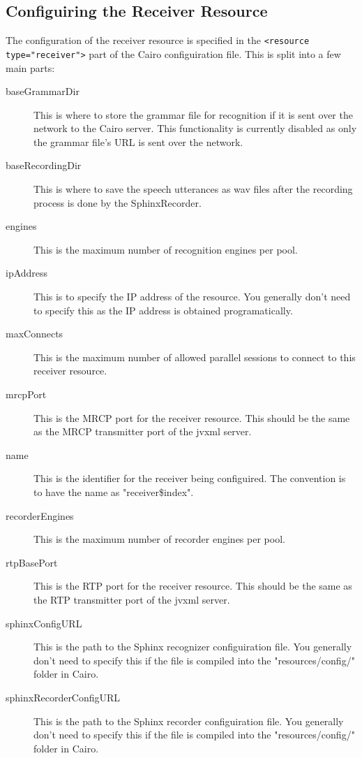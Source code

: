 \subsection{Configuiring the Receiver Resource}
The configuration of the receiver resource is specified in the \lstinline$<resource type="receiver">$ part of the Cairo configuiration file.
This is split into a few main parts:
\begin{description}
  \item[baseGrammarDir] This is where to store the grammar file for recognition if it is sent over the network to the Cairo server. This functionality is currently disabled as only the grammar file's URL is sent over the network.
  \item[baseRecordingDir] This is where to save the speech utterances as wav files after the recording process is done by the SphinxRecorder. 
  \item[engines] This is the maximum number of recognition engines per pool.
  \item[ipAddress] This is to specify the IP address of the resource. You generally don't need to specify this as the IP address is obtained programatically.
  \item[maxConnects] This is the maximum number of allowed parallel sessions to connect to this receiver resource.
  \item[mrcpPort] This is the MRCP port for the receiver resource. This should be the same as the MRCP transmitter port of the \ac{jvxml} server.
  \item[name] This is the identifier for the receiver being configuired. The convention is to have the name as "receiver\$index".
  \item[recorderEngines] This is the maximum number of recorder engines per pool.
  \item[rtpBasePort] This is the RTP port for the receiver resource. This should be the same as the RTP transmitter port of the \ac{jvxml} server.
  \item[sphinxConfigURL] This is the path to the Sphinx recognizer configuiration file. You generally don't need to specify this if the file is compiled into the "resources/config/" folder in Cairo.
  \item[sphinxRecorderConfigURL] This is the path to the Sphinx recorder configuiration file. You generally don't need to specify this if the file is compiled into the "resources/config/" folder in Cairo. 
\end{description}

